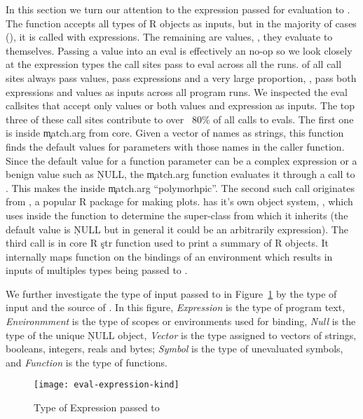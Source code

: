 \documentclass[USenglish,cleveref, autoref, thm-restate]{lipics-v2019}
\begin{document}
In this section we turn our attention to the expression passed for evaluation to
\eval. The \eval function accepts all types of R objects as inputs, but in the
majority of cases (\AllExpressionInputEvalCallPerc), it is called with
expressions. The remaining \AllValueInputEvalCallPerc are values, \ie, they
evaluate to themselves.
%
Passing a value into an eval is effectively an no-op so we look closely at the
expression types the call sites pass to eval across all the runs.
\AllValueInputEvalSitePerc of all call sites always pass values,
\AllExpressionInputEvalSitePerc pass expressions and a very large proportion,
\AllPolymorphicInputEvalSitePerc, pass both expressions and values as inputs
across all program runs. We inspected the eval callsites that accept only values
or both values and expression as inputs. The top three of these call sites
contribute to over ~80\% of all calls to evals. The first one is inside
\c{match.arg} from core. Given a vector of names as strings, this function finds
the default values for parameters with those names in the caller function. Since
the default value for a function parameter can be a complex expression or a
benign value such as \c{NULL}, the \c{match.arg} function evaluates it through a
call to \eval. This makes the \eval inside \c{match.arg} ``polymorhpic''. The
second such \eval call originates from \ggplot, a popular R package for making
plots. \ggplot has it's own object system, \ggproto, which uses \eval inside the
\ggproto function to determine the super-class from which it inherits (the
default value is \c{NULL} but in general it could be an arbitrarily expression).
The third \eval call is in core R \c{str} function used to print a summary of R
objects. It internally maps \eval function on the bindings of an environment
which results in inputs of multiples types being passed to \eval.

We further investigate the type of input passed to \eval in
Figure~\ref{fig:eval-expression-kind} by the type of input and the source of
\eval. In this figure, \emph{Expression} is the type of program text,
\emph{Environmment} is the type of scopes or environments used for binding,
\emph{Null} is the type of the unique \c{NULL} object, \emph{Vector} is the
type assigned to vectors of strings, booleans, integers, reals and bytes;
\emph{Symbol} is the type of unevaluated symbols, and \emph{Function} is the
type of functions.

\begin{figure}[!h]
  \centering
  \texttt{[image: eval-expression-kind]}
  \caption{Type of Expression passed to \eval} \label{fig:eval-expression-kind}
\end{figure}
\end{document}
